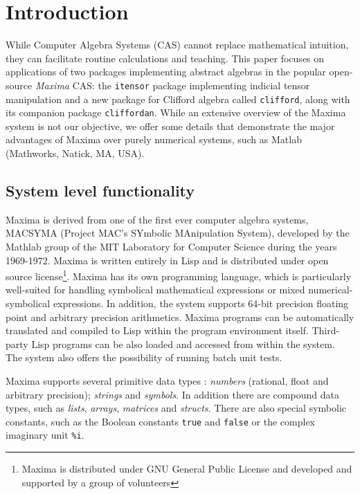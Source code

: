 \documentclass[twoside,reqno,11pt]{amsart}
\theoremstyle{definition}
\theoremstyle{remark}
\numberwithin{equation}{section}
\newcommand{\symb}[1]{{\tt #1}}
\begin{document}
\Addresses


\section{Introduction}
\label{sec:intro}

While Computer Algebra Systems (CAS) cannot replace mathematical intuition, they can facilitate routine calculations and teaching.
This paper focuses on applications of two packages implementing abstract algebras in the popular open-source {\em Maxima} CAS:
the \symb{itensor} package implementing indicial tensor manipulation and a new package for Clifford algebra called \symb{clifford}, along with its companion package \symb{cliffordan}.
While an extensive overview of the Maxima system is not our objective, we offer some details that demonstrate the major advantages of Maxima over purely numerical systems, such as Matlab (Mathworks, Natick, MA, USA).

\subsection{System level functionality}
\label{sec:maxintro}

Maxima is derived from one of the first ever computer algebra systems, MACSYMA (Project MAC's SYmbolic MAnipulation System),  developed by the Mathlab group of the MIT Laboratory for Computer Science during the years 1969-1972.
Maxima is written entirely in Lisp and is distributed under open source license\footnote{Maxima is distributed under GNU General Public License and developed and supported by a group of volunteers}.
Maxima has its own programming language, which is particularly well-suited for handling symbolical mathematical expressions or mixed numerical-symbolical expressions.
In addition, the system supports 64-bit precision floating point and arbitrary precision arithmetics.
Maxima programs can be automatically translated and compiled to Lisp within the program environment itself.
Third-party Lisp programs can be also loaded and accessed from within the system.
The system also offers the possibility of running batch unit tests.

Maxima supports several primitive data types \cite{M2015}:
\textit{numbers} (rational, float and arbitrary precision);
\textit{strings} and \textit{symbols}.
In addition there are compound data types, such as \textit{lists},
 \textit{arrays}, \textit{matrices} and \textit{structs}.
There are also special symbolic constants, such as the Boolean constants \symb{true} and \symb{false} or the complex imaginary unit \symb{\%i}.
\end{document}
